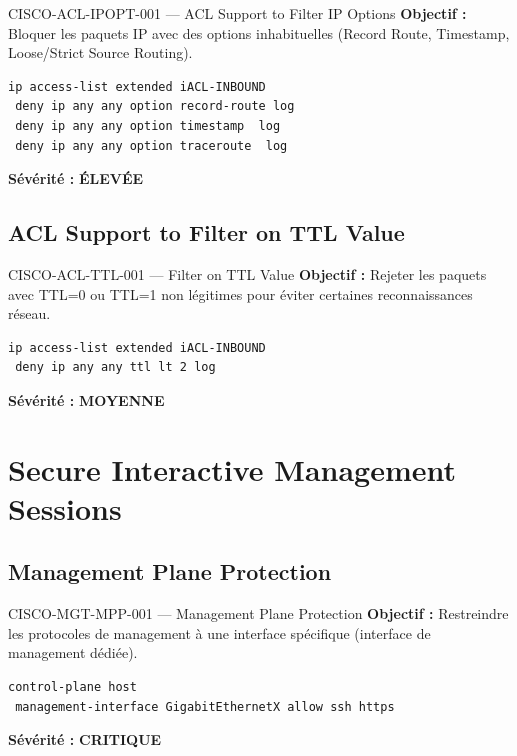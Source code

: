 \documentclass[12pt, a4paper]{report}
\begin{document}
\begin{rulebox}{CISCO-ACL-IPOPT-001 — ACL Support to Filter IP Options}
  \textbf{Objectif :} Bloquer les paquets IP avec des options inhabituelles (Record Route, Timestamp, Loose/Strict Source Routing).

  \begin{lstlisting}
ip access-list extended iACL-INBOUND
 deny ip any any option record-route log
 deny ip any any option timestamp  log
 deny ip any any option traceroute  log
  \end{lstlisting}

  \textbf{Sévérité :} \textcolor{accentOrange}{\textbf{ÉLEVÉE}}
\end{rulebox}

\subsection{ACL Support to Filter on TTL Value}

\begin{rulebox}{CISCO-ACL-TTL-001 — Filter on TTL Value}
  \textbf{Objectif :} Rejeter les paquets avec TTL=0 ou TTL=1 non légitimes pour éviter certaines reconnaissances réseau.

  \begin{lstlisting}
ip access-list extended iACL-INBOUND
 deny ip any any ttl lt 2 log
  \end{lstlisting}

  \textbf{Sévérité :} \textcolor{accentGreen}{\textbf{MOYENNE}}
\end{rulebox}

\section{Secure Interactive Management Sessions}

\subsection{Management Plane Protection}

\begin{rulebox}{CISCO-MGT-MPP-001 — Management Plane Protection}
  \textbf{Objectif :} Restreindre les protocoles de management à une interface spécifique (interface de management dédiée).

  \begin{lstlisting}
control-plane host
 management-interface GigabitEthernetX allow ssh https
  \end{lstlisting}

  \textbf{Sévérité :} \textcolor{accentRed}{\textbf{CRITIQUE}}
\end{rulebox}
\end{document}
